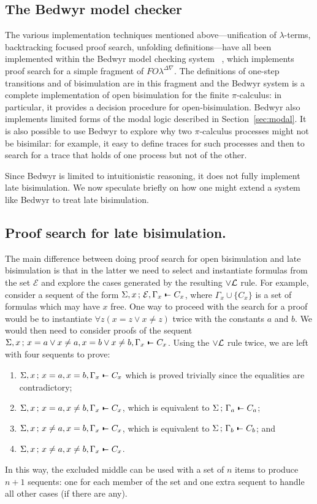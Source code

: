 \documentclass{acmtrans2m}
\def\Escr{{\mathcal E}}
\def\relbar{\mathrel{\smash-}}
\def\joinrelm{\mathrel{\mkern-3.2mu}}
\def\tailpiece{\kern 1pt\vrule height 1ex width 0.3ex depth -.25ex}
\def\seqsym{\mathrel{\tailpiece\joinrelm\relbar}}
\newcommand{\FOL   }{FO\lambda}
\newcommand{\FOLDNb}{\FOL^{\Delta\nabla}}
\newcommand{\NSeq}[3]{#1\,;\,#2 \seqsym #3}
\newcommand{\lorL}{\lor{\cal L}}
\begin{document}
\subsection{The Bedwyr model checker}

The various implementation techniques mentioned above---unification of
$\lambda$-terms, backtracking focused proof search, unfolding
definitions---have all been implemented within the Bedwyr model
checking system ~\cite{baelde07cade}, which implements proof search for a
simple fragment \cite{tiu05eshol} of $\FOLDNb$.  The definitions of
one-step transitions and of bisimulation are in this fragment and the
Bedwyr system is a complete implementation of open bisimulation for
the finite $\pi$-calculus: in particular, it provides a decision
procedure for open-bisimulation.  Bedwyr also implements limited forms
of the modal logic described in Section~\ref{sec:modal}.  It is also
possible to use Bedwyr to explore why two $\pi$-calculus
processes might not be bisimilar: for example, it easy to define
traces for such processes and then to search for a trace that holds of
one process but not of the other. 


Since Bedwyr is limited to intuitionistic reasoning, it does not
fully implement late bisimulation.  We now speculate briefly on how
one might extend a system like Bedwyr to treat late bisimulation.

\subsection{Proof search for late bisimulation.}
The main difference between doing proof search for open bisimulation
and late bisimulation is that in the latter we need to select and
instantiate formulas from the set $\Escr$ and explore the cases
generated by the resulting $\lorL$ rule. 
For example, consider a sequent of the form $\NSeq{\Sigma,
  x}{\Escr,\Gamma_x}{C_x}$, where $\Gamma_x\cup\{C_x\}$ is a set of
formulas 
which may have $x$ free.  One way to proceed with the search for a proof
would be to instantiate $\forall z(x=z\lor x\not=z)$ twice with the
constants $a$ and $b$.  We would then need to consider proofs of the
sequent  
$\NSeq{\Sigma, x}{x=a\lor x\not=a,x=b\lor x\not=b,\Gamma_x}{C_x}$.
Using the $\lorL$ rule twice, we are left with four sequents to prove:
\begin{enumerate}
\item $\NSeq{\Sigma, x}{x=a,x=b,\Gamma_x}{C_x}$ which is 
  proved trivially since the equalities are contradictory; 
\item $\NSeq{\Sigma, x}{x=a,x\not=b,\Gamma_x}{C_x}$, which is
  equivalent to $\NSeq{\Sigma}{\Gamma_a}{C_a}$;
\item $\NSeq{\Sigma, x}{x\not=a,x=b,\Gamma_x}{C_x}$, which is
  equivalent to $\NSeq{\Sigma}{\Gamma_b}{C_b}$; and 
\item $\NSeq{\Sigma, x}{x\not=a,x\not=b,\Gamma_x}{C_x}$.
\end{enumerate}
In this way, the excluded middle can be used with a set of $n$ items
to produce $n+1$ sequents: one for each member of the set and
one extra sequent to handle all other cases (if there are any).
\end{document}
